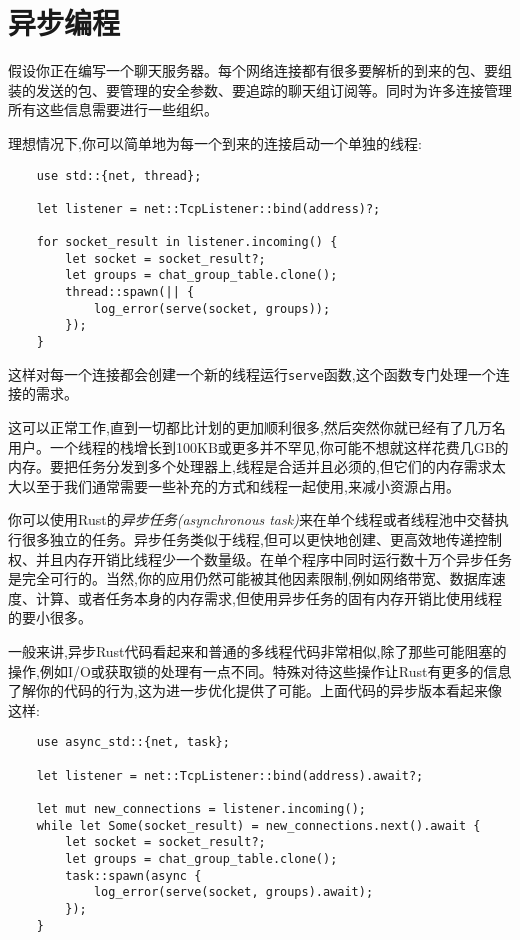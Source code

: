 \chapter{异步编程}\label{ch20}

假设你正在编写一个聊天服务器。每个网络连接都有很多要解析的到来的包、要组装的发送的包、要管理的安全参数、要追踪的聊天组订阅等。同时为许多连接管理所有这些信息需要进行一些组织。

理想情况下,你可以简单地为每一个到来的连接启动一个单独的线程:
\begin{verbatim}
    use std::{net, thread};

    let listener = net::TcpListener::bind(address)?;

    for socket_result in listener.incoming() {
        let socket = socket_result?;
        let groups = chat_group_table.clone();
        thread::spawn(|| {
            log_error(serve(socket, groups));
        });
    }
\end{verbatim}

这样对每一个连接都会创建一个新的线程运行\texttt{serve}函数,这个函数专门处理一个连接的需求。

这可以正常工作,直到一切都比计划的更加顺利很多,然后突然你就已经有了几万名用户。一个线程的栈增长到100KB或更多并不罕见,你可能不想就这样花费几GB的内存。要把任务分发到多个处理器上,线程是合适并且必须的,但它们的内存需求太大以至于我们通常需要一些补充的方式和线程一起使用,来减小资源占用。

你可以使用Rust的\emph{异步任务(asynchronous task)}来在单个线程或者线程池中交替执行很多独立的任务。异步任务类似于线程,但可以更快地创建、更高效地传递控制权、并且内存开销比线程少一个数量级。在单个程序中同时运行数十万个异步任务是完全可行的。当然,你的应用仍然可能被其他因素限制,例如网络带宽、数据库速度、计算、或者任务本身的内存需求,但使用异步任务的固有内存开销比使用线程的要小很多。

一般来讲,异步Rust代码看起来和普通的多线程代码非常相似,除了那些可能阻塞的操作,例如I/O或获取锁的处理有一点不同。特殊对待这些操作让Rust有更多的信息了解你的代码的行为,这为进一步优化提供了可能。上面代码的异步版本看起来像这样:
\begin{verbatim}
    use async_std::{net, task};

    let listener = net::TcpListener::bind(address).await?;

    let mut new_connections = listener.incoming();
    while let Some(socket_result) = new_connections.next().await {
        let socket = socket_result?;
        let groups = chat_group_table.clone();
        task::spawn(async {
            log_error(serve(socket, groups).await);
        });
    }
\end{verbatim}

